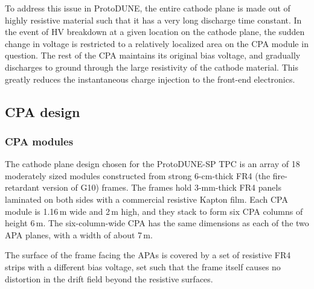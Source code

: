 To address this issue in ProtoDUNE, the entire cathode plane is made out of highly resistive material such that it has a very long discharge time constant.  In the event of HV breakdown at a given location on the cathode plane, the sudden change in voltage is restricted to  a relatively localized area on the CPA module in question.  The rest of the CPA maintains its original bias voltage, and gradually discharges to ground through the large resistivity of the cathode material.  This greatly reduces the instantaneous charge injection to the front-end electronics.


\subsection{CPA design}

\subsubsection{CPA modules}


The cathode plane design chosen for the ProtoDUNE-SP TPC is an array of 18 moderately sized modules constructed from strong 6-cm-thick FR4 (the fire-retardant version of G10) frames. The frames hold 3-mm-thick FR4 panels laminated on both sides with a commercial resistive Kapton film.   Each CPA module is 1.16\,m wide and 2\,m high, and they stack to form six CPA columns of height 6\,m.  The six-column-wide CPA has the same dimensions as each of the two APA planes, with a width of about 7\,m.

 The surface of the frame facing the APAs is covered by a set of resistive FR4 strips with a different bias voltage, set such that 
 the frame itself causes no distortion in the drift field beyond the resistive surfaces.

